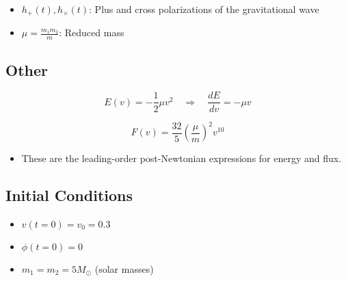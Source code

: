 \documentclass{article}
\begin{document}
\begin{itemize}
  \item \( h_+(t), h_{\times}(t) \): Plus and cross polarizations of the gravitational wave
  \item \( \mu = \frac{m_1 m_2}{m} \): Reduced mass
\end{itemize}

\subsection*{Other}

\begin{equation}
E(v) = -\frac{1}{2} \mu v^2 \quad \Rightarrow \quad \frac{dE}{dv} = -\mu v
\end {equation}

\begin{equation}
F(v) = \frac{32}{5} \left( \frac{\mu}{m} \right)^2 v^{10}
\end {equation}

\begin{itemize}
  \item These are the leading-order post-Newtonian expressions for energy and flux.
\end{itemize}

\subsection *{Initial Conditions}

\begin{itemize}
  \item \( v(t=0) = v_0 = 0.3 \)
  \item \( \phi(t=0) = 0 \)
  \item \( m_1 = m_2 = 5 M_{\odot} \) (solar masses)
\end{itemize}
\end{document}
